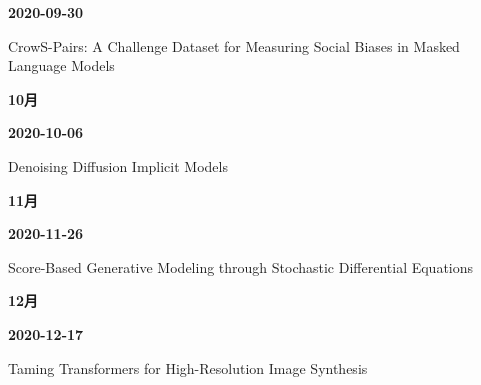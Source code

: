 \smallskip
\noindent\textbf{2020-09-30}\par
{\raggedright CrowS-Pairs: A Challenge Dataset for Measuring Social Biases in Masked Language Models\par}
\smallskip
\medskip
\noindent\textbf{10月}\par
\smallskip
\noindent\textbf{2020-10-06}\par
{\raggedright Denoising Diffusion Implicit Models\par}
\smallskip
\medskip
\noindent\textbf{11月}\par
\smallskip
\noindent\textbf{2020-11-26}\par
{\raggedright Score-Based Generative Modeling through Stochastic Differential Equations\par}
\smallskip
\medskip
\noindent\textbf{12月}\par
\smallskip
\noindent\textbf{2020-12-17}\par
{\raggedright Taming Transformers for High-Resolution Image Synthesis\par}
\smallskip
